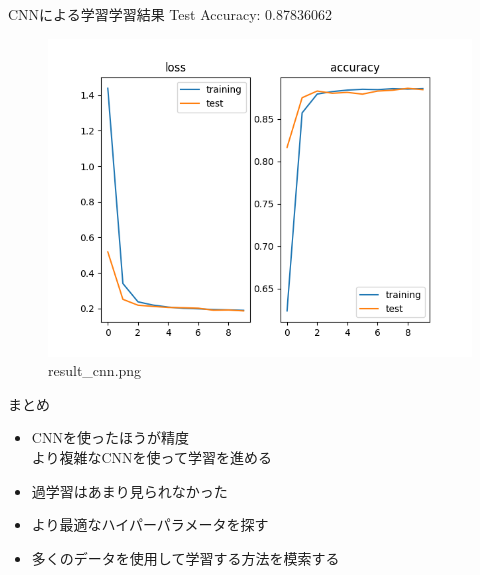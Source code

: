 \documentclass[uplatex, dvipdfmx]{beamer}
\begin{document}
  \begin{frame}{CNNによる学習学習結果}
    Test Accuracy: 0.87836062
    \begin{figure}[H]
      \centering
      \includegraphics[keepaspectratio, scale=0.5]{images/train_cnn.png}
      \caption{result\_cnn.png}
    \end{figure}
  \end{frame}

  \begin{frame}{まとめ}
    \begin{itemize}
      \item CNNを使ったほうが精度\mbox{}\\
        より複雑なCNNを使って学習を進める
      \item 過学習はあまり見られなかった
      \item より最適なハイパーパラメータを探す
      \item 多くのデータを使用して学習する方法を模索する
    \end{itemize}
  \end{frame}
\end{document}
